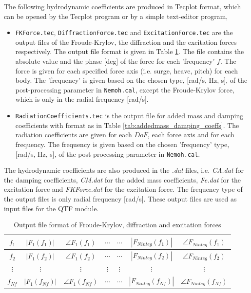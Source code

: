\documentclass[12pt,a4paper,titlepage]{article}
\begin{document}
The following hydrodynamic coefficients are produced in Tecplot format, which can be opened by the Tecplot program or by a simple text-editor program,
\begin{itemize}
\item \texttt{FKForce.tec}, \texttt{DiffractionForce.tec} and \texttt{ExcitationForce.tec} are the output files of the Froude-Krylov, the diffraction and the excitation forces respectively. The output file format is given in Table \ref{tab:WaveForce}. The file contains the absolute value and the phase [deg] of the force for each 'frequency' $f$. The force is given for each specified force axis (i.e. surge, heave, pitch) for each body. The 'frequency' is given based on the chosen type, [rad/s, Hz, s], of the post-processing parameter in \texttt{Nemoh.cal}, except the Froude-Krylov force, which is only in the radial frequency [rad/s].
\item \texttt{RadiationCoefficients.tec} is the output file for added mass and damping coefficients with format as in Table \ref{tab:addedmass_damping_coeffs}. The radiation coefficients are given for each $DoF$, each force axis and for each frequency. The frequency is given based on the chosen 'frequency' type, [rad/s, Hz, s], of the post-processing parameter in \texttt{Nemoh.cal}.
\end{itemize}
The hydrodynamic coefficients are also produced in the \textit{.dat} files, i.e. \textit{CA.dat} for the damping coefficients, \textit{CM.dat} for the added mass coefficients, \textit{Fe.dat} for the excitation force and \textit{FKForce.dat} for the excitation force. The frequency type of the output files is only radial frequency [rad/s]. These output files are used as input files for the QTF module. \\

\begin{table}[ht]
\begin{center}
\caption{Output file format of Froude-Krylov, diffraction and excitation forces}\label{tab:WaveForce}
\begin{tabular}{ccccccc}
\hline
$f_1$ & $|F_1(f_1)|$ & $\angle F_1(f_1)$ &$\cdots$ &$\cdots$&$|F_{Ninteg}(f_1)|$ & $\angle F_{Ninteg}(f_1)$ \\
\hline
$f_2$ &  $|F_1(f_2)|$ & $\angle F_1(f_2)$ &$\cdots$ &$\cdots$&$|F_{Ninteg}(f_2)|$ & $\angle F_{Ninteg}(f_2)$ \\
\hline
$\vdots$ & $\vdots$ & $\vdots$ & $\vdots$ & $\vdots$ & $\vdots$ & $\vdots$ \\
\hline
$f_{Nf}$ &  $|F_1(f_{Nf})|$ & $\angle F_1(f_{Nf})$ &$\cdots$ &$\cdots$&$|F_{Ninteg}(f_{Nf})|$ & $\angle F_{Ninteg}(f_{Nf})$ \\
\hline
\end{tabular}
\end{center}
\end{table}
\end{document}
